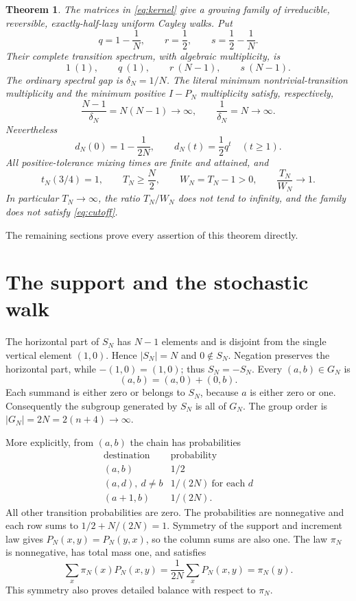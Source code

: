 \documentclass[11pt,a4paper]{article}
\newtheorem{theorem}{Theorem}[section]
\theoremstyle{definition}
\theoremstyle{remark}
\begin{document}
\begin{theorem}\label{thm:main}
The matrices in \eqref{eq:kernel} give a growing family of irreducible,
reversible, exactly-half-lazy uniform Cayley walks. Put
\begin{equation}\label{eq:qrs}
q=1-\frac1N,\qquad r=\frac12,\qquad s=\frac12-\frac1N.
\end{equation}
Their complete transition spectrum, with algebraic multiplicity, is
\[
1\ (1),\qquad q\ (1),\qquad r\ (N-1),\qquad s\ (N-1).
\]
The ordinary spectral gap is $\delta_N=1/N$. The literal minimum
nontrivial-transition multiplicity and the minimum positive $I-P_N$
multiplicity satisfy, respectively,
\begin{equation}\label{eq:ratios}
\frac{N-1}{\delta_N}=N(N-1)\longrightarrow\infty,
\qquad
\frac1{\delta_N}=N\longrightarrow\infty.
\end{equation}
Nevertheless
\begin{equation}\label{eq:tv-main}
d_N(0)=1-\frac1{2N},\qquad
d_N(t)=\frac12q^t\quad(t\ge1).
\end{equation}
All positive-tolerance mixing times are finite and attained, and
\begin{equation}\label{eq:time-main}
t_N(3/4)=1,\qquad T_N\ge\frac N2,\qquad
W_N=T_N-1>0,\qquad \frac{T_N}{W_N}\longrightarrow1.
\end{equation}
In particular $T_N\to\infty$, the ratio $T_N/W_N$ does not tend to infinity,
and the family does not satisfy \eqref{eq:cutoff}.
\end{theorem}

The remaining sections prove every assertion of this theorem directly.

\section{The support and the stochastic walk}

The horizontal part of $S_N$ has $N-1$ elements and is disjoint from the
single vertical element $(1,0)$. Hence $|S_N|=N$ and $0\notin S_N$.
Negation preserves the horizontal part, while $-(1,0)=(1,0)$; thus
$S_N=-S_N$. Every $(a,b)\in G_N$ is
\[
(a,b)=(a,0)+(0,b).
\]
Each summand is either zero or belongs to $S_N$, because $a$ is either zero
or one. Consequently the subgroup generated by $S_N$ is all of $G_N$.
The group order is $|G_N|=2N=2(n+4)\to\infty$.

More explicitly, from $(a,b)$ the chain has probabilities
\[
\begin{array}{c|c}
\text{destination}&\text{probability}\\ \hline
(a,b)&1/2\\
(a,d),\ d\ne b&1/(2N)\ \text{for each }d\\
(a+1,b)&1/(2N).
\end{array}
\]
All other transition probabilities are zero. The probabilities are
nonnegative and each row sums to $1/2+N/(2N)=1$. Symmetry of the support and
increment law gives $P_N(x,y)=P_N(y,x)$, so the column sums are also one.
The law $\pi_N$ is nonnegative, has total mass one, and satisfies
\[
\sum_x\pi_N(x)P_N(x,y)=\frac1{2N}\sum_xP_N(x,y)=\pi_N(y).
\]
This symmetry also proves detailed balance with respect to $\pi_N$.
\end{document}
